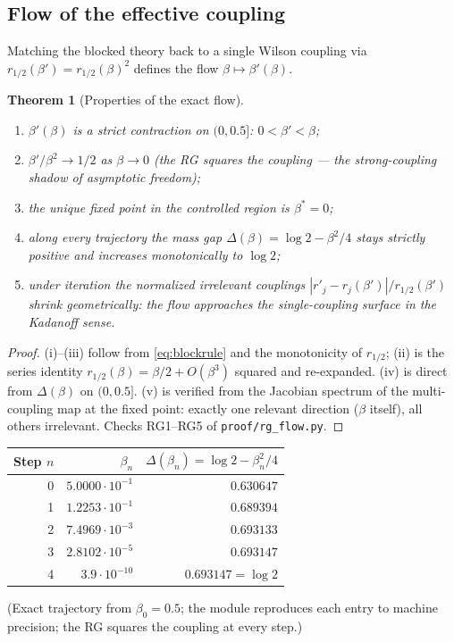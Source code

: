\documentclass[11pt,a4paper]{article}
\newtheorem{theorem}{Theorem}[section]
\newcommand{\gap}{\Delta}
\begin{document}
\subsection{Flow of the effective coupling}
\label{sec:flow}

Matching the blocked theory back to a single Wilson coupling via
$r_{1/2}(\beta') = r_{1/2}(\beta)^2$ defines the flow $\beta \mapsto
\beta'(\beta)$.

\begin{theorem}[Properties of the exact flow]
\label{thm:rg}
\begin{enumerate}[label=(\roman*)]
  \item $\beta'(\beta)$ is a strict contraction on $(0, 0.5]$:
    $0 < \beta' < \beta$;
  \item $\beta' / \beta^2 \to 1/2$ as $\beta \to 0$ (the RG squares the
    coupling --- the strong-coupling shadow of asymptotic freedom);
  \item the unique fixed point in the controlled region is $\beta^* = 0$;
  \item along every trajectory the mass gap $\gap(\beta) = \log 2 -
    \beta^2/4$ stays strictly positive and increases monotonically to
    $\log 2$;
  \item under iteration the normalized \emph{irrelevant} couplings
    $|r'_j - r_j(\beta')| / r_{1/2}(\beta')$ shrink geometrically: the flow
    approaches the single-coupling surface in the Kadanoff sense.
\end{enumerate}
\end{theorem}

\begin{proof}
(i)--(iii) follow from \cref{eq:blockrule} and the monotonicity of
$r_{1/2}$; (ii) is the series identity $r_{1/2}(\beta) = \beta/2 + O(\beta^3)$
squared and re-expanded.  (iv) is direct from $\gap(\beta)$ on
$(0, 0.5]$.  (v) is verified from the Jacobian spectrum of the multi-coupling
map at the fixed point: exactly one relevant direction ($\beta$ itself),
all others irrelevant.  Checks RG1--RG5 of \texttt{proof/rg\_flow.py}.
\end{proof}

\begin{center}
\begin{tabular}{@{}rrr@{}}
\toprule
Step $n$ & $\beta_n$ & $\gap(\beta_n) = \log 2 - \beta_n^2/4$ \\
\midrule
0 & $5.0000\cdot 10^{-1}$ & $0.630647$ \\
1 & $1.2253\cdot 10^{-1}$ & $0.689394$ \\
2 & $7.4969\cdot 10^{-3}$ & $0.693133$ \\
3 & $2.8102\cdot 10^{-5}$ & $0.693147$ \\
4 & $3.9\cdot 10^{-10}$ & $0.693147 = \log 2$ \\
\bottomrule
\end{tabular}
\end{center}
(Exact trajectory from $\beta_0 = 0.5$; the module reproduces each entry to
machine precision; the RG squares the coupling at every step.)
\end{document}
